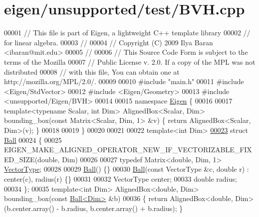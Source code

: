\hypertarget{eigen_2unsupported_2test_2_b_v_h_8cpp_source}{}\section{eigen/unsupported/test/\+B\+VH.cpp}
\label{eigen_2unsupported_2test_2_b_v_h_8cpp_source}

\begin{DoxyCode}
00001 \textcolor{comment}{// This file is part of Eigen, a lightweight C++ template library}
00002 \textcolor{comment}{// for linear algebra.}
00003 \textcolor{comment}{//}
00004 \textcolor{comment}{// Copyright (C) 2009 Ilya Baran <ibaran@mit.edu>}
00005 \textcolor{comment}{//}
00006 \textcolor{comment}{// This Source Code Form is subject to the terms of the Mozilla}
00007 \textcolor{comment}{// Public License v. 2.0. If a copy of the MPL was not distributed}
00008 \textcolor{comment}{// with this file, You can obtain one at http://mozilla.org/MPL/2.0/.}
00009 
00010 \textcolor{preprocessor}{#include "main.h"}
00011 \textcolor{preprocessor}{#include <Eigen/StdVector>}
00012 \textcolor{preprocessor}{#include <Eigen/Geometry>}
00013 \textcolor{preprocessor}{#include <unsupported/Eigen/BVH>}
00014 
00015 \textcolor{keyword}{namespace }\hyperlink{namespace_eigen}{Eigen} \{
00016 
00017 \textcolor{keyword}{template}<\textcolor{keyword}{typename} Scalar, \textcolor{keywordtype}{int} Dim> AlignedBox<Scalar, Dim> bounding\_box(\textcolor{keyword}{const} Matrix<Scalar, Dim, 1> &v) \{ \textcolor{keywordflow}{
      return} AlignedBox<Scalar, Dim>(v); \}
00018 
00019 \}
00020 
00021 
00022 \textcolor{keyword}{template}<\textcolor{keywordtype}{int} Dim>
\hyperlink{struct_ball}{00023} \textcolor{keyword}{struct }\hyperlink{struct_ball}{Ball}
00024 \{
00025 EIGEN\_MAKE\_ALIGNED\_OPERATOR\_NEW\_IF\_VECTORIZABLE\_FIXED\_SIZE(\textcolor{keywordtype}{double}, Dim)
00026 
00027   \textcolor{keyword}{typedef} Matrix<double, Dim, 1> \hyperlink{struct_vector_type}{VectorType};
00028 
00029   \hyperlink{struct_ball}{Ball}() \{\}
00030   \hyperlink{struct_ball}{Ball}(\textcolor{keyword}{const} VectorType &c, \textcolor{keywordtype}{double} r) : center(c), radius(r) \{\}
00031 
00032   VectorType center;
00033   \textcolor{keywordtype}{double} radius;
00034 \};
00035 \textcolor{keyword}{template}<\textcolor{keywordtype}{int} Dim> AlignedBox<double, Dim> bounding\_box(\textcolor{keyword}{const} \hyperlink{struct_ball}{Ball<Dim>} &b)
00036 \{ \textcolor{keywordflow}{return} AlignedBox<double, Dim>(b.center.array() - b.radius, b.center.array() + b.radius); \}

\end{DoxyCode}
